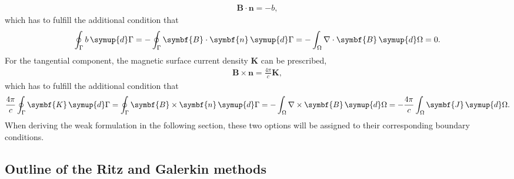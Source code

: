 \documentclass[a4paper, twoside, 10pt, english]{article}
\numberwithin{equation}{section}
\let\vec\symbf
\newcommand*\curl{\ensuremath{\nabla \times}}
\begin{document}
\begin{gather*}
  \vec{B} \cdot \vec{n} = -b,
\end{gather*}
which has to fulfill the additional condition that
\begin{gather*}
  \oint_{\Gamma} b \, \symup{d} \Gamma = -\oint_{\Gamma} \symbf{B} \cdot \symbf{n} \, \symup{d} \Gamma = -\int_{\Omega} \nabla \cdot \symbf{B} \, \symup{d} \Omega = 0.
\end{gather*}
For the tangential component, the magnetic surface current density $\vec{K}$ can be prescribed,
\begin{gather*}
  \vec{B} \times \vec{n} = \frac{4 \pi}{c} \vec{K},
\end{gather*}
which has to fulfill the additional condition that
\begin{gather*}
  \frac{4 \pi}{c} \oint_{\Gamma} \vec{K} \, \symup{d} \Gamma = \oint_{\Gamma} \vec{B} \times \vec{n} \, \symup{d} \Gamma = -\int_{\Omega} \curl \vec{B} \, \symup{d} \Omega = -\frac{4 \pi}{c} \int_{\Omega} \vec{J} \, \symup{d} \Omega.
\end{gather*}
When deriving the weak formulation in the following section, these two options will be assigned to their corresponding boundary conditions.

\subsection{Outline of the Ritz and Galerkin methods}
\label{sec:ritz-galerkin}
\end{document}
